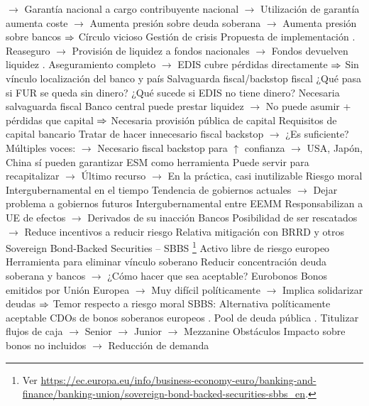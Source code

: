 \documentclass{nuevotema}
\begin{document}
\begin{esquemal}
				\4[] $\to$ Garantía nacional a cargo contribuyente nacional
				\4[] $\to$ Utilización de garantía aumenta coste
				\4[] $\to$ Aumenta presión sobre deuda soberana
				\4[] $\to$ Aumenta presión sobre bancos
				\4[] $\then$ Círculo vicioso
				\4[] Gestión de crisis
				\4 Propuesta de implementación
				. Reaseguro
				\4[] $\to$ Provisión de liquidez a fondos nacionales
				\4[] $\to$ Fondos devuelven liquidez
				. Aseguramiento completo
				\4[] $\to$ EDIS cubre pérdidas directamente
				\4[] $\then$ Sin vínculo localización del banco y país
			\3 Salvaguarda fiscal/backstop fiscal
				\4 ¿Qué pasa si FUR se queda sin dinero?
				\4 ¿Qué sucede si EDIS no tiene dinero?
				\4[$\then$] Necesaria salvaguarda fiscal
				\4[] Banco central puede prestar liquidez
				\4[] $\to$ No puede asumir + pérdidas que capital
				\4[] $\then$ Necesaria provisión pública de capital
				\4 Requisitos de capital bancario
				\4[] Tratar de hacer innecesario fiscal backstop
				\4[] $\to$ ¿Es suficiente?
				\4[] Múltiples voces:
				\4[] $\to$ Necesario fiscal backstop para $\uparrow$ confianza
				\4[] $\to$ USA, Japón, China sí pueden garantizar
				\4 ESM como herramienta
				\4[] Puede servir para recapitalizar
				\4[] $\to$ Último recurso
				\4[] $\to$ En la práctica, casi inutilizable
			\3 Riesgo moral
				\4 Intergubernamental en el tiempo
				\4[] Tendencia de gobiernos actuales
				\4[] $\to$ Dejar problema a gobiernos futuros
				\4 Intergubernamental entre EEMM
				\4[] Responsabilizan a UE de efectos
				\4[] $\to$ Derivados de su inacción
				\4 Bancos
				\4[] Posibilidad de ser rescatados
				\4[] $\to$ Reduce incentivos a reducir riesgo
				\4[] Relativa mitigación con BRRD y otros
			\3 Sovereign Bond-Backed Securities -- SBBS \footnote{Ver \url{https://ec.europa.eu/info/business-economy-euro/banking-and-finance/banking-union/sovereign-bond-backed-securities-sbbs_en}.}
				\4 Activo libre de riesgo europeo
				\4[] Herramienta para eliminar vínculo soberano
				\4[] Reducir concentración deuda soberana y bancos
				\4[] $\to$ ¿Cómo hacer que sea aceptable?
				\4 Eurobonos
				\4[] Bonos emitidos por Unión Europea
				\4[] $\to$ Muy difícil políticamente
				\4[] $\to$ Implica solidarizar deudas
				\4[] $\then$ Temor respecto a riesgo moral
				\4 SBBS: Alternativa políticamente aceptable
				\4[] CDOs de bonos soberanos europeos
				. Pool de deuda pública
				. Titulizar flujos de caja
				\4[] $\to$ Senior
				\4[] $\to$ Junior
				\4[] $\to$ Mezzanine
				\4 Obstáculos
				\4[] Impacto sobre bonos no incluidos
				\4[] $\to$ Reducción de demanda

\end{esquemal}
\end{document}
